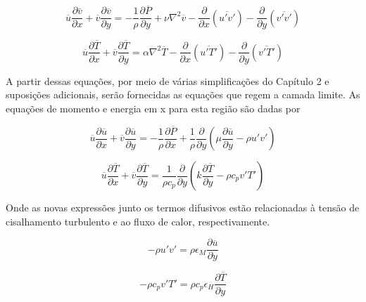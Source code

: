 \documentclass[12pt]{article}
\begin{document}
\begin{equation}
	\overline{u} \frac{\partial \overline{v}}{\partial x} + \overline{v} \frac{\partial \overline{v}}{\partial y}  = - \frac{1}{\rho} \frac{\partial \overline{P}}{\partial y} + \nu \nabla^2 \overline{v} - \frac{\partial}{\partial x} \left( \overline{u'v'} \right) - \frac{\partial}{\partial y} \left( \overline{v'v'} \right) 
\end{equation}

\begin{equation}
	\overline{u} \frac{\partial \overline{T}}{\partial x} + \overline{v} \frac{\partial \overline{T}}{\partial y} = \alpha \nabla^2 \overline{T} - \frac{\partial}{\partial x} \left( \overline{u'T'} \right) - \frac{\partial}{\partial y} \left( \overline{v'T'} \right)
\end{equation}

A partir dessas equações, por meio de várias simplificações do Capítulo 2 e suposições adicionais, serão fornecidas as equações que regem a camada limite.
As equações de momento e energia em x para esta região são dadas por

\begin{equation}
	\overline{u} \frac{\partial \overline{u}}{\partial x} + \overline{v} \frac{\partial \overline{u}}{\partial y} = - \frac{1}{\rho} \frac{\partial \overline{P}}{\partial x} + \frac{1}{\rho} \frac{\partial}{\partial y} \left( \mu \frac{\partial \overline{u}}{\partial y} - \rho u'v' \right)
\end{equation}

\begin{equation}
	\overline{u} \frac{\partial \overline{T}}{\partial x} + \overline{v} \frac{\partial \overline{T}}{\partial y} = \frac{1}{\rho c_p} \frac{\partial}{\partial y} \left( k \frac{\partial \overline{T}}{\partial y} - \rho c_p v' T' \right)
\end{equation}

Onde as novas expressões junto os termos difusivos estão relacionadas à tensão de cisalhamento turbulento e ao fluxo de calor, respectivamente.

\begin{equation}
	-\rho u'v' = \rho \epsilon_M \frac{\partial \overline{u}}{\partial y}
\end{equation}

\begin{equation}
	-\rho c_p v' T' = \rho c_p \epsilon_H \frac{\partial \overline{T}}{\partial y} 
\end{equation}
\end{document}
